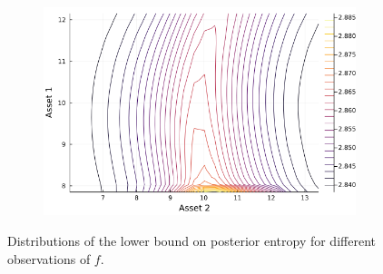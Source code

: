 \documentclass{article}
\begin{document}
\begin{figure}
\begin{subfigure}{0.4\textwidth}
    \end{subfigure}
    \begin{subfigure}{0.4\textwidth}
        \includegraphics[width=\textwidth]{../plots/params/more-corr-meanvarshift/entropy_lower.png}
    \end{subfigure}
    \caption{Distributions of the lower bound on posterior entropy for different observations of $f$.}
    \label{fig:entropy_lower}
\end{figure}
\end{document}
